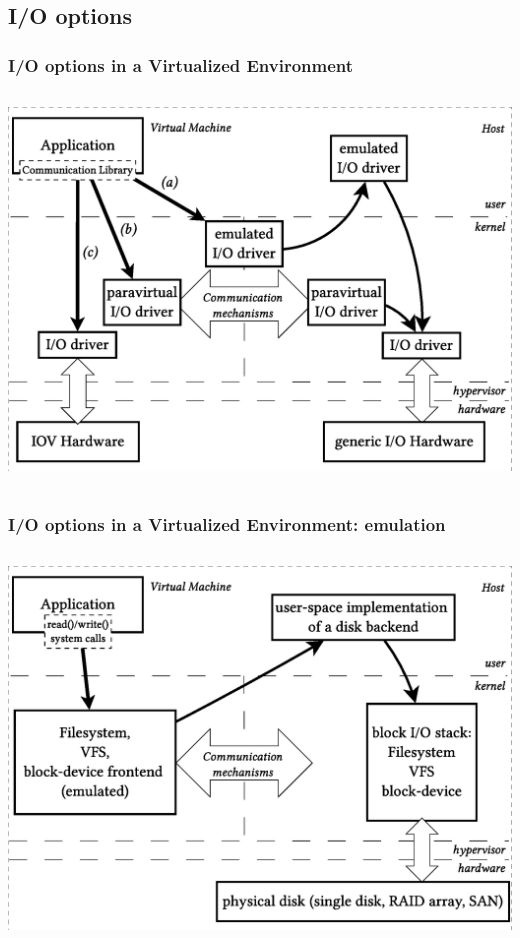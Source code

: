 \documentclass[red,slidestop,notes,compress,mathserif]{beamer}
\begin{document}
\subsection{I/O options}
\begin{frame}
\frametitle{I/O options in a Virtualized Environment}
\begin{columns}
\includegraphics[width=\textwidth]{figs/bare/io_comm.eps}
\end{columns}
\end{frame}



\begin{frame}
\frametitle{I/O options in a Virtualized Environment: emulation}
\begin{columns}
\includegraphics[width=\textwidth]{figs/bare/io_emulated.eps}
\end{columns}
\end{frame}
\end{document}
